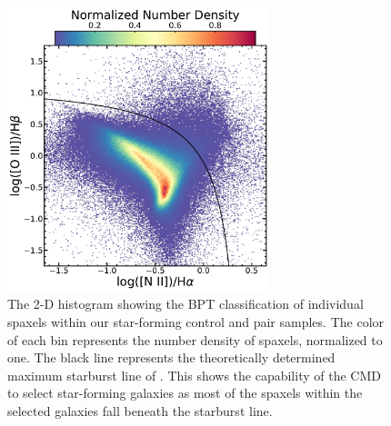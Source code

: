 \documentclass[iop,revtex4,twocolumn,apj,numberedappendix,appendixfloats]{emulateapj}
\begin{document}
\begin{figure}
\centering
\includegraphics[width=3in]{fig/bpt_spax.pdf}
\caption[BPT classification of MaNGA spaxels.]{The 2-D histogram showing the BPT classification \citep{Baldwin:1981} of individual spaxels within our star-forming control and pair samples. The color of each bin represents the number density of spaxels, normalized to one. The black line represents the theoretically determined maximum starburst line of \citet{Kewley:2001}. This shows the capability of the CMD to select star-forming galaxies as most of the spaxels within the selected galaxies fall beneath the starburst line.}
\label{fig:bpt_spax}
\end{figure}
\end{document}
